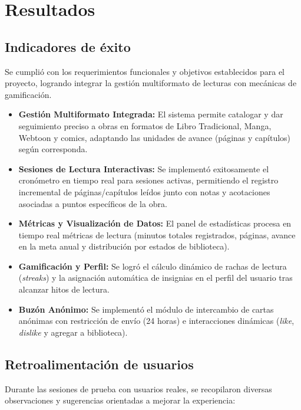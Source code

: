\documentclass[12pt, atypical, journal]{article}
\begin{document}
\newpage

\section{Resultados}

\subsection{Indicadores de éxito}
Se cumplió con los requerimientos funcionales y objetivos establecidos para el proyecto, logrando integrar la gestión multiformato de lecturas con mecánicas de gamificación.

\begin{itemize}
	\item \textbf{Gestión Multiformato Integrada:} El sistema permite catalogar y dar seguimiento preciso a obras en formatos de Libro Tradicional, Manga, Webtoon y comics, adaptando las unidades de avance (páginas y capítulos) según corresponda.
	
	\item \textbf{Sesiones de Lectura Interactivas:} Se implementó exitosamente el cronómetro en tiempo real para sesiones activas, permitiendo el registro incremental de páginas/capítulos leídos junto con notas y acotaciones asociadas a puntos específicos de la obra.
	
	\item \textbf{Métricas y Visualización de Datos:} El panel de estadísticas procesa en tiempo real métricas de lectura (minutos totales registrados, páginas, avance en la meta anual y distribución por estados de biblioteca).
	
	\item \textbf{Gamificación y Perfil:} Se logró el cálculo dinámico de rachas de lectura (\textit{streaks}) y la asignación automática de insignias en el perfil del usuario tras alcanzar hitos de lectura.
	
	\item \textbf{Buzón Anónimo:} Se implementó el módulo de intercambio de cartas anónimas con restricción de envío (24 horas) e interacciones dinámicas (\textit{like}, \textit{dislike} y agregar a biblioteca).
\end{itemize}

\subsection{Retroalimentación de usuarios}
Durante las sesiones de prueba con usuarios reales, se recopilaron diversas observaciones y sugerencias orientadas a mejorar la experiencia:
\end{document}
